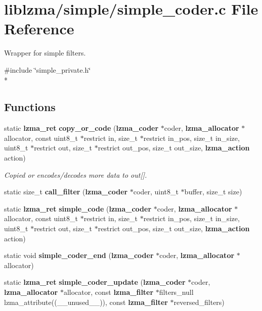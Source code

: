 \section{liblzma/simple/simple\-\_\-coder.c File Reference}
\label{simple__coder_8c}


Wrapper for simple filters.  


{\ttfamily \#include \char`\"{}simple\-\_\-private.\-h\char`\"{}}\\*
\subsection*{Functions}
\begin{DoxyCompactItemize}
\item 
static {\bf lzma\-\_\-ret} {\bf copy\-\_\-or\-\_\-code} ({\bf lzma\-\_\-coder} $\ast$coder, {\bf lzma\-\_\-allocator} $\ast$allocator, const uint8\-\_\-t $\ast$restrict in, size\-\_\-t $\ast$restrict in\-\_\-pos, size\-\_\-t in\-\_\-size, uint8\-\_\-t $\ast$restrict out, size\-\_\-t $\ast$restrict out\-\_\-pos, size\-\_\-t out\-\_\-size, {\bf lzma\-\_\-action} action)
\begin{DoxyCompactList}\small\item\em Copied or encodes/decodes more data to out[]. \end{DoxyCompactList}\item 
static size\-\_\-t {\bfseries call\-\_\-filter} ({\bf lzma\-\_\-coder} $\ast$coder, uint8\-\_\-t $\ast$buffer, size\-\_\-t size)\label{simple__coder_8c_a3f130655d2df4adcb2349d873c71496a}

\item 
static {\bf lzma\-\_\-ret} {\bfseries simple\-\_\-code} ({\bf lzma\-\_\-coder} $\ast$coder, {\bf lzma\-\_\-allocator} $\ast$allocator, const uint8\-\_\-t $\ast$restrict in, size\-\_\-t $\ast$restrict in\-\_\-pos, size\-\_\-t in\-\_\-size, uint8\-\_\-t $\ast$restrict out, size\-\_\-t $\ast$restrict out\-\_\-pos, size\-\_\-t out\-\_\-size, {\bf lzma\-\_\-action} action)\label{simple__coder_8c_ad5dde7322206b584c91f92b5d7d6885f}

\item 
static void {\bfseries simple\-\_\-coder\-\_\-end} ({\bf lzma\-\_\-coder} $\ast$coder, {\bf lzma\-\_\-allocator} $\ast$allocator)\label{simple__coder_8c_a551611edb8ad15a1940193212dd23d67}

\item 
static {\bf lzma\-\_\-ret} {\bfseries simple\-\_\-coder\-\_\-update} ({\bf lzma\-\_\-coder} $\ast$coder, {\bf lzma\-\_\-allocator} $\ast$allocator, const {\bf lzma\-\_\-filter} $\ast$filters\-\_\-null lzma\-\_\-attribute((\-\_\-\-\_\-unused\-\_\-\-\_\-)), const {\bf lzma\-\_\-filter} $\ast$reversed\-\_\-filters)\label{simple__coder_8c_a121741750585de308b07bb2b173ab019}


\end{DoxyCompactItemize}
